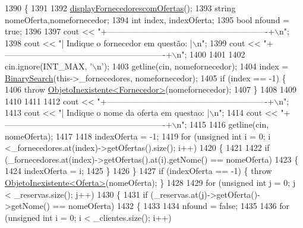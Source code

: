 \begin{DoxyCode}
1390                                                 \{
1391     
1392     \hyperlink{classEmpresa_aa47e9a64800a41180b7f374b73a1f32b}{displayFornecedorescomOfertas}();
1393     \textcolor{keywordtype}{string} nomeOferta,nomefornecedor;
1394     \textcolor{keywordtype}{int} index, indexOferta;
1395     \textcolor{keywordtype}{bool} nfound = \textcolor{keyword}{true};
1396 
1397     cout << \textcolor{stringliteral}{"+----------------------------------------------------------+\(\backslash\)n"};
1398     cout << \textcolor{stringliteral}{"| Indique o fornecedor em questão:                         |\(\backslash\)n"};
1399     cout << \textcolor{stringliteral}{"+----------------------------------------------------------+\(\backslash\)n"};
1400 
1401 
1402     cin.ignore(INT\_MAX, \textcolor{charliteral}{'\(\backslash\)n'});
1403     getline(cin, nomefornecedor);
1404     index = \hyperlink{extras_8h_abc85c93edf561168b5bbee8054caa388}{BinarySearch}(this->\_fornecedores, nomefornecedor);
1405     \textcolor{keywordflow}{if} (index == -1) \{
1406         \textcolor{keywordflow}{throw} \hyperlink{classObjetoInexistente}{ObjetoInexistente<Fornecedor>}(nomefornecedor);
1407     \}
1408 
1409 
1410     
1411 
1412     cout << \textcolor{stringliteral}{"+----------------------------------------------------------+\(\backslash\)n"};
1413     cout << \textcolor{stringliteral}{"| Indique o nome da oferta em questao:                     |\(\backslash\)n"};
1414     cout << \textcolor{stringliteral}{"+----------------------------------------------------------+\(\backslash\)n"};
1415 
1416     getline(cin, nomeOferta);
1417 
1418     indexOferta = -1;
1419     \textcolor{keywordflow}{for} (\textcolor{keywordtype}{unsigned} \textcolor{keywordtype}{int} i = 0; i <\_fornecedores.at(index)->getOfertas().size(); i++)
1420     \{
1421 
1422         \textcolor{keywordflow}{if} (\_fornecedores.at(index)->getOfertas().at(i).getNome() == nomeOferta)
1423         \{
1424             indexOferta = i;
1425         \}
1426     \}
1427     \textcolor{keywordflow}{if} (indexOferta == -1) \{ \textcolor{keywordflow}{throw} \hyperlink{classObjetoInexistente}{ObjetoInexistente<Oferta>}(nomeOferta); \}
1428 
1429     \textcolor{keywordflow}{for} (\textcolor{keywordtype}{unsigned} \textcolor{keywordtype}{int} j = 0; j < \_reservas.size(); j++)
1430     \{
1431         \textcolor{keywordflow}{if} (\_reservas.at(j)->getOferta()->getNome() == nomeOferta)
1432         \{
1433 
1434             nfound = \textcolor{keyword}{false};
1435 
1436             \textcolor{keywordflow}{for} (\textcolor{keywordtype}{unsigned} \textcolor{keywordtype}{int} i = 0; i < \_clientes.size(); i++)

\end{DoxyCode}

